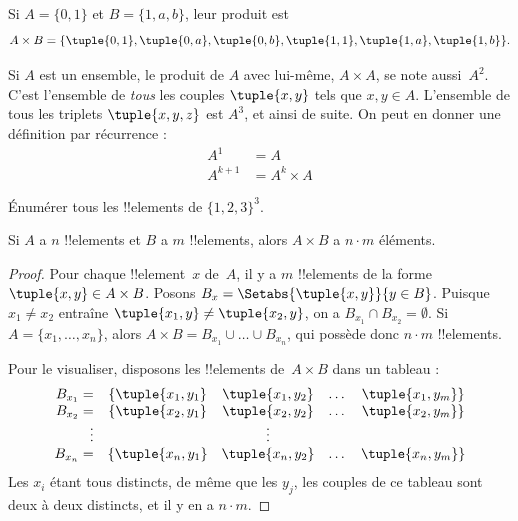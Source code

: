 \documentclass[11pt,a4paper,openany]{memoir}
\begin{document}
\begin{ex}
Si $A = \{0, 1\}$ et $B = \{1, a, b\}$, leur produit est
\[
A \times B = \{ \tuple{0, 1}, \tuple{0, a}, \tuple{0, b},
    \tuple{1, 1}, \tuple{1, a}, \tuple{1, b} \}.
\]
\end{ex}

\begin{ex}
Si $A$ est un ensemble, le produit de $A$ avec lui-même, $A \times A$,
se note aussi~$A^2$. C'est l'ensemble de \emph{tous} les couples
$\tuple{x, y}$ tels que $x, y \in A$.
L'ensemble de tous les triplets $\tuple{x, y, z}$ est $A^3$,
et ainsi de suite. On peut en donner une définition par récurrence :
\begin{align*}
  A^1 & = A\\
  A^{k+1} & = A^k \times A
\end{align*}
\end{ex}

\begin{prob}
Énumérer tous les !!{element}s de $\{1, 2, 3\}^3$.
\end{prob}

\begin{prop}
Si $A$ a $n$ !!{element}s et $B$ a $m$ !!{element}s, alors
$A \times B$ a $n\cdot m$ éléments.
\end{prop}

\begin{proof}
Pour chaque !!{element}~$x$ de~$A$, il y a $m$ !!{element}s
de la forme $\tuple{x, y} \in A \times B$.
Posons $B_x = \Setabs{\tuple{x, y}}{y \in B}$.
Puisque $x_1 \neq x_2$ entraîne
$\tuple{x_1, y} \neq \tuple{x_2, y}$, on a
$B_{x_1} \cap B_{x_2} = \emptyset$.
Si $A = \{x_1, \dots, x_n\}$, alors
$A \times B = B_{x_1} \cup \dots \cup B_{x_n}$,
qui possède donc $n\cdot m$ !!{element}s.

Pour le visualiser, disposons les !!{element}s de~$A \times B$
dans un tableau :
\[
\begin{array}{rcccc}
  B_{x_1} = & \{\tuple{x_1, y_1} & \tuple{x_1, y_2} & \dots & \tuple{x_1, y_m}\}\\
  B_{x_2} = & \{\tuple{x_2, y_1} & \tuple{x_2, y_2} & \dots & \tuple{x_2, y_m}\}\\
  \vdots & & \vdots\\
  B_{x_n} = & \{\tuple{x_n, y_1} & \tuple{x_n, y_2} & \dots & \tuple{x_n, y_m}\}
\end{array}
\]
Les $x_i$ étant tous distincts, de même que les $y_j$,
les couples de ce tableau sont deux à deux distincts,
et il y en a $n\cdot m$.
\end{proof}
\end{document}
